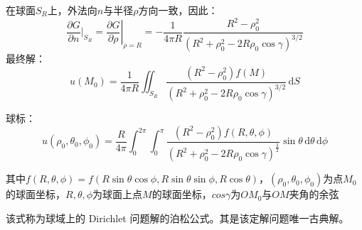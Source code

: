 在球面\(S_R\)上，外法向\(n\)与半径\(\rho\)方向一致，因此：
\[
\frac{\partial G}{\partial n}|_{S_R}=\left. \frac{\partial G}{\partial\rho}\right|_{\rho=R}=-\frac{1}{4\pi R}\frac{R^2-\rho_0^2}{(R^2+\rho_0^2-2R\rho_0\cos\gamma)^{3/2}}
\]
最终解：
\[
u(M_0)=\frac{1}{4\pi R}\iint_{S_R}\frac{(R^2-\rho_0^2)f(M)}{(R^2+\rho_0^2-2R\rho_0\cos\gamma)^{3/2}}\,\mathrm{d}S
\]

球标：
\[
u(\rho_0,\theta_0,\phi_0)=\frac{R}{4\pi}\int_{0}^{2\pi}\int_{0}^{\pi}\frac{\left(R^2-\rho_0^2\right)f\left(R,\theta,\phi\right)}{(R^2+\rho_0^2-2R\rho_0\cos\gamma)^\frac{3}{2}}\sin{\theta}\,\mathrm{d}\theta\,\mathrm{d}\phi
\]

其中\(f(R,\theta,\phi)=f(R\sin{\theta\cos{\phi}},R\sin{\theta\sin{\phi}},R\cos{\theta})\)，\((\rho_0,\theta_0,\phi_0)\)为点\(M_0\)的球面坐标，\(R,\theta,\phi\)为球面上点\(M\)的球面坐标，\(cos\gamma\)为\(OM_0\)与\(OM\)夹角的余弦

该式称为球域上的 Dirichlet 问题解的泊松公式。其是该定解问题唯一古典解。